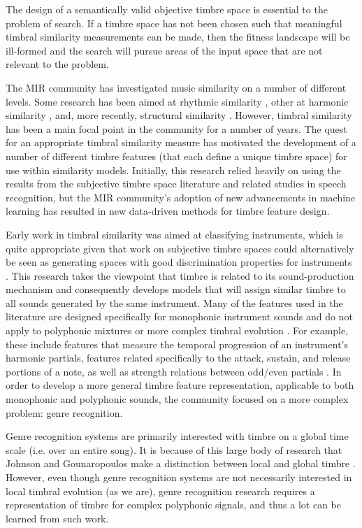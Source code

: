 \documentclass[12pt]{report} 	%
\numberwithin{figure}{chapter}
\numberwithin{table}{chapter}
\numberwithin{equation}{chapter}
\begin{document}
\begin{flushleft}
The design of a semantically valid objective timbre space is essential to the problem of search. If a timbre space has not been chosen such that meaningful timbral similarity measurements can be made, then the fitness landscape will be ill-formed and the search will pursue areas of the input space that are not relevant to the problem.

The MIR community has investigated music similarity on a number of different levels. Some research has been aimed at rhythmic similarity \cite{Paulus:2002ec}, other at harmonic similarity \cite{Haas:2009mw}, and, more recently, structural similarity \cite{Bello:NoRead}. However, timbral similarity has been a main focal point in the community for a number of years. The quest for an appropriate timbral similarity measure has motivated the development of a number of different timbre features (that each define a unique timbre space) for use within similarity models. Initially, this research relied heavily on using the results from the subjective timbre space literature and related studies in speech recognition, but the MIR community's adoption of new advancements in machine learning has resulted in new data-driven methods for timbre feature design.

Early work in timbral similarity was aimed at classifying instruments, which is quite appropriate given that work on subjective timbre spaces could alternatively be seen as generating spaces with good discrimination properties for instruments \cite{Loureiro:2000wq, Park:2004fv, Timoney:2004ff, Zhang:2006jo}. This research takes the viewpoint that timbre is related to its sound-production mechanism and consequently develops models that will assign similar timbre to all sounds generated by the same instrument. Many of the features used in the literature are designed specifically for monophonic instrument sounds and do not apply to polyphonic mixtures or more complex timbral evolution \cite[p. 6]{Ciglar:2009uf}. For example, these include features that measure the temporal progression of an instrument's harmonic partials, features related specifically to the attack, sustain, and release portions of a note, as well as strength relations between odd/even partials \cite[p. 182]{Timoney:2004ff}. In order to develop a more general timbre feature representation, applicable to both monophonic and polyphonic sounds, the community focused on a more complex problem: genre recognition.

Genre recognition systems are primarily interested with timbre on a global time scale (i.e. over an entire song). It is because of this large body of research that Johnson and Gounaropoulos make a distinction between local and global timbre \cite{Johnson:2006pi}. However, even though genre recognition systems are not necessarily interested in local timbral evolution (as we are), genre recognition research requires a representation of timbre for complex polyphonic signals, and thus a lot can be learned from such work.


\end{flushleft}
\end{document}
